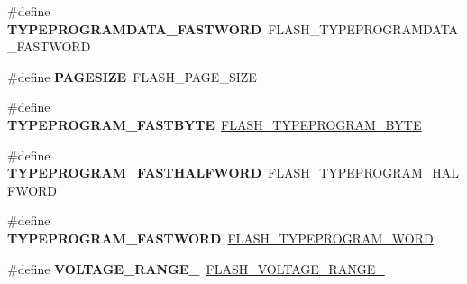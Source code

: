 \begin{DoxyCompactItemize}
\#define {\bfseries T\+Y\+P\+E\+P\+R\+O\+G\+R\+A\+M\+D\+A\+T\+A\+\_\+\+F\+A\+S\+T\+W\+O\+RD}~F\+L\+A\+S\+H\+\_\+\+T\+Y\+P\+E\+P\+R\+O\+G\+R\+A\+M\+D\+A\+T\+A\+\_\+\+F\+A\+S\+T\+W\+O\+RD
\item 
\mbox{\label{group___h_a_l___f_l_a_s_h___aliased___defines_ga519adc2af3ba06a8f0548b6690050a89}} 
\#define {\bfseries P\+A\+G\+E\+S\+I\+ZE}~F\+L\+A\+S\+H\+\_\+\+P\+A\+G\+E\+\_\+\+S\+I\+ZE
\item 
\mbox{\label{group___h_a_l___f_l_a_s_h___aliased___defines_ga07e4cba7de4bf96cfafa957245f9d06d}} 
\#define {\bfseries T\+Y\+P\+E\+P\+R\+O\+G\+R\+A\+M\+\_\+\+F\+A\+S\+T\+B\+Y\+TE}~\mbox{\hyperlink{group___f_l_a_s_h___type___program_gac975d7139325057ed0069c6b55e4faed}{F\+L\+A\+S\+H\+\_\+\+T\+Y\+P\+E\+P\+R\+O\+G\+R\+A\+M\+\_\+\+B\+Y\+TE}}
\item 
\mbox{\label{group___h_a_l___f_l_a_s_h___aliased___defines_gad562e3d208ce464a19d5ec356e7f21ff}} 
\#define {\bfseries T\+Y\+P\+E\+P\+R\+O\+G\+R\+A\+M\+\_\+\+F\+A\+S\+T\+H\+A\+L\+F\+W\+O\+RD}~\mbox{\hyperlink{group___f_l_a_s_h___type___program_ga2b607dfc2efd463a8530e327bc755582}{F\+L\+A\+S\+H\+\_\+\+T\+Y\+P\+E\+P\+R\+O\+G\+R\+A\+M\+\_\+\+H\+A\+L\+F\+W\+O\+RD}}
\item 
\mbox{\label{group___h_a_l___f_l_a_s_h___aliased___defines_ga1c170a7eba13377a1922bf6750b1f0ce}} 
\#define {\bfseries T\+Y\+P\+E\+P\+R\+O\+G\+R\+A\+M\+\_\+\+F\+A\+S\+T\+W\+O\+RD}~\mbox{\hyperlink{group___f_l_a_s_h___type___program_gadd25c6821539030ba6711e7c0d586c3e}{F\+L\+A\+S\+H\+\_\+\+T\+Y\+P\+E\+P\+R\+O\+G\+R\+A\+M\+\_\+\+W\+O\+RD}}
\item 
\mbox{\label{group___h_a_l___f_l_a_s_h___aliased___defines_ga5a1b1ceafccd5ab37c7cfbebc9527329}} 
\#define {\bfseries V\+O\+L\+T\+A\+G\+E\+\_\+\+R\+A\+N\+G\+E\+\_}~\mbox{\hyperlink{group___f_l_a_s_h_ex___voltage___range_ga5cadf49a63c968cde3b980e5139d398e}{F\+L\+A\+S\+H\+\_\+\+V\+O\+L\+T\+A\+G\+E\+\_\+\+R\+A\+N\+G\+E\+\_}}
\item 
\mbox{\label{group___h_a_l___f_l_a_s_h___aliased___defines_ga1c0639cea187d17c4dad607fe124a94f}} 

\end{DoxyCompactItemize}
